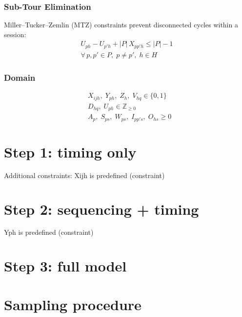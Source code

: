 \subsubsection{Sub-Tour Elimination}

Miller--Tucker--Zemlin (MTZ) constraints prevent disconnected cycles within a
session:
%
\begin{align}
  U_{ph} - U_{p'h} + |P|\, X_{pp'h} \leq |P| - 1 \nonumber \\
  \forall\, p,p' \in P,\; p \neq p',\; h \in H
  \label{eq:mtz}
\end{align}

\subsubsection{Domain}

\begin{align}
  & X_{ijh},\; Y_{ph},\; Z_h,\; V_{hq} \in \{0,1\}
  \label{eq:dom_bin} \\[2pt]
  & D_{hq},\; U_{ph} \in \mathbb{Z}_{\geq 0}
  \qquad 
  \label{eq:dom_viol} \\[2pt]
  & A_p,\; S_{ps},\; W_{ps},\; I_{pp's},\; O_{hs} \geq 0
\end{align}

\section{Step 1: timing only}
Additional constraints: Xijh is predefined (constraint)

\section{Step 2: sequencing + timing}
Yph is predefined (constraint)

\section{Step 3: full model}

\section{Sampling procedure}
